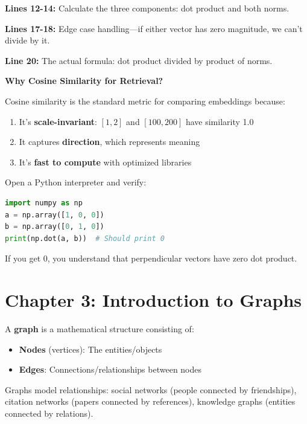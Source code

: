 \documentclass[12pt,a4paper]{article}
\begin{document}
\begin{explanation}
\textbf{Lines 12-14:} Calculate the three components: dot product and both norms.

\textbf{Lines 17-18:} Edge case handling---if either vector has zero magnitude, we can't divide by it.

\textbf{Line 20:} The actual formula: dot product divided by product of norms.
\end{explanation}

\begin{concept}
\textbf{Why Cosine Similarity for Retrieval?}

Cosine similarity is the standard metric for comparing embeddings because:
\begin{enumerate}
    \item It's \textbf{scale-invariant}: $[1, 2]$ and $[100, 200]$ have similarity 1.0
    \item It captures \textbf{direction}, which represents meaning
    \item It's \textbf{fast to compute} with optimized libraries
\end{enumerate}
\end{concept}

\begin{checkpoint}
Open a Python interpreter and verify:
\begin{lstlisting}[language=Python]
import numpy as np
a = np.array([1, 0, 0])
b = np.array([0, 1, 0])
print(np.dot(a, b))  # Should print 0
\end{lstlisting}
If you get 0, you understand that perpendicular vectors have zero dot product.
\end{checkpoint}

\section{Chapter 3: Introduction to Graphs}

\begin{concept}
A \textbf{graph} is a mathematical structure consisting of:
\begin{itemize}
    \item \textbf{Nodes} (vertices): The entities/objects
    \item \textbf{Edges}: Connections/relationships between nodes
\end{itemize}

Graphs model relationships: social networks (people connected by friendships), citation networks (papers connected by references), knowledge graphs (entities connected by relations).
\end{concept}
\end{document}
